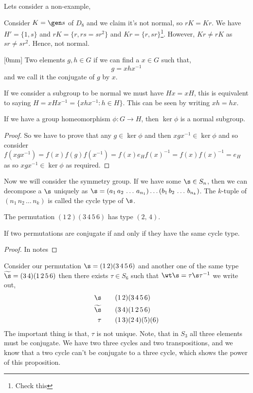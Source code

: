 Lets consider a non-example,
\begin{eg}
  Consider $K = \gen s$ of $D_8$ and we claim it's not normal, so $rK = Kr$. We have $H' = \{1, s\}$ and $rK = \{r, rs = sr^2\}$ and $Kr = \{r, sr\}$\footnote{Check this}. However, $Kr \ne rK$ as $sr \ne sr^2$. Hence, not normal.
\end{eg}

\begin{ndefi}[Conjugate][0mm]
  Two elements $g,h \in G$ if we can find a $x \in G$ such that,
  $$ g = x h x^{-1} $$
  and we call it the conjugate of $g$ by $x$.
\end{ndefi}
If we consider a subgroup to be normal we must have $Hx = xH$, this is equivalent to saying $H = xHx^{-1} = \{xhx^{-1} : h \in H\}$. This can be seen by writing $xh = hx$.

\begin{nlemma}
  If we have a group homeomorphism $\phi : G \to H$, then $\ker \phi$ is a normal subgroup.
\end{nlemma}
\begin{proof}
  So we have to prove that any $g \in \ker \phi$ and then $xgx^{-1} \in \ker\phi$ and so consider $f(xgx^{-1}) = f(x)f(g)f(x^{-1}) = f(x)e_{H}f(x)^{-1} = f(x)f(x)^{-1} = e_H$ as so $xgx^{-1} \in \ker\phi$ as required.
\end{proof}

Now we will consider the symmetry group. If we have some $\s \in S_n$, then we can decompose a $\s$ uniquely as $\s = (a_1\,a_2\,\dots\, a_{n_1})\dots (b_1\,b_2\,\dots\,b_{n_k})$. The $k$-tuple of $(n_1\, n_2\,\dots\, n_k)$ is called the cycle type of $\s$.

\begin{eg}
  The permutation $(1\,2)(3\,4\,5\,6)$ has type $(2,\,4)$.
\end{eg}

\begin{nprop}
  If two permutations are conjugate if and only if they have the same cycle type.
\end{nprop}
\begin{proof}
  In notes
\end{proof}

Consider our permutation $\s = (1\,2)(3\,4\,5\,6)$ and another one of the same type $\widetilde\s = (3\,4)(1\,2\,5\,6)$ then there exists $\tau \in S_6$ such that $\wt\s = \tau\s\tau^{-1}$ we write out,
\begin{align*}
  \s \qquad& (1\,2)(3\,4\,5\,6)\\
  \widetilde{\s} \qquad& (3\,4)(1\,2\,5\,6)\\
  \tau \qquad& (1\,3)(2\,4)(5)(6)
\end{align*}
The important thing is that, $\tau$ is not unique. Note, that in $S_3$ all three elements must be conjugate. We have two three cycles and two transpositions, and we know that a two cycle can't be conjugate to a three cycle, which shows the power of this proposition.\\

